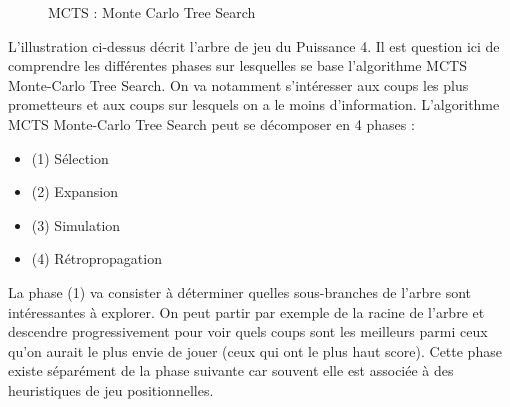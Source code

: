 \documentclass[a4paper]{article}
\begin{document}
\begin{figure}[!h] 
\centering
{}
\caption{MCTS : Monte Carlo Tree Search} 
\end{figure}



L'illustration ci-dessus décrit l'arbre de jeu du Puissance 4. Il est question ici de comprendre les différentes phases sur lesquelles se base l'algorithme MCTS Monte-Carlo Tree Search.
On va notamment s’intéresser aux coups les plus prometteurs et aux coups sur lesquels on a le moins d’information. 
L’algorithme MCTS Monte-Carlo Tree Search peut se décomposer en 4 phases :
\vspace{0.4cm}

\begin{itemize}

\item (1) Sélection
\item (2) Expansion
\item (3) Simulation
\item (4) Rétropropagation 

\end{itemize}

\vspace{0.3cm}

La phase (1) va consister à déterminer quelles sous-branches de l’arbre sont intéressantes à explorer.
On peut partir par exemple de la racine de l'arbre et descendre progressivement pour voir quels coups sont les meilleurs parmi ceux qu’on aurait le plus envie de jouer (ceux qui ont le plus haut score).
Cette phase existe séparément de la phase suivante car souvent elle est associée à des heuristiques de jeu positionnelles.
\end{document}
